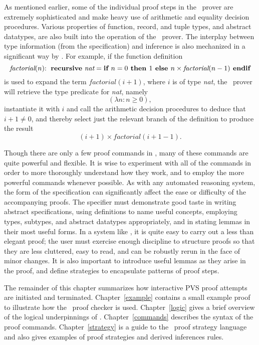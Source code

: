 \documentclass[12pt,twoside]{book}
\begin{document}
As mentioned earlier,  some of the individual proof steps in the
\pvs\ prover  are extremely sophisticated and make heavy use of
arithmetic and equality decision procedures.  
Various properties of function, record, and tuple
types, and abstract datatypes, are also built into the operation of
the \pvs\ prover.  The interplay between type information (from the
specification) and inference is also mechanized in a significant way
by \pvs.  For example, if the function definition
\[\textit{factorial}(n) {\bf :\ recursive\ } \textit{nat} = \mbox{\bf if\ } n=0
\mbox{\bf \ then } 1 \mbox{\bf \ else } n\times \textit{factorial}(n-1) \mbox{\bf \ endif}\] 
is used to expand the term $\textit{factorial}(i+1)$, where $i$ is of
type \emph{nat}, the \pvs\ prover will retrieve the type predicate
for \emph{nat}, namely \[(\lambda n: n \geq 0),\] instantiate it
with $i$ and call the arithmetic decision procedures to deduce that
$i+1 \neq 0$, and thereby select just the relevant branch of the
definition to produce the result 
\[ (i+1)\times \textit{factorial}(i+1-1). \]

Though there are only a few proof commands in \pvs, many of these commands
are quite powerful and flexible.  It is wise to experiment with all of the
commands in order to more thoroughly understand how they work, and to
employ the more powerful commands whenever possible.  As with any
automated reasoning system, the form of the specification can
significantly affect the ease or difficulty of the accompanying proofs.
The specifier must demonstrate good taste in writing abstract
specifications, using definitions to name useful concepts, employing
types, subtypes, and abstract datatypes appropriately, and in stating
lemmas in their most useful forms.  In a system like \pvs, it is quite
easy to carry out a less than elegant proof; the user must exercise enough
discipline to structure proofs so that they are less cluttered, easy to
read, and can be robustly rerun in the face of minor changes.  It is also
important to introduce useful lemmas as they arise in the proof, and
define strategies to encapsulate patterns of proof steps.

The remainder of this chapter summarizes how interactive PVS proof attempts are
initiated and terminated.  Chapter~\ref{example} contains a small example
proof to illustrate how the \pvs\ proof checker is used.
Chapter~\ref{logic} gives a brief overview of the logical underpinnings of
\pvs\@.  Chapter~\ref{commands} describes the syntax of the proof
commands.  Chapter~\ref{strategy} is a guide to the \pvs\ proof strategy
language and also gives examples of proof strategies and derived
inferences rules.
\end{document}
